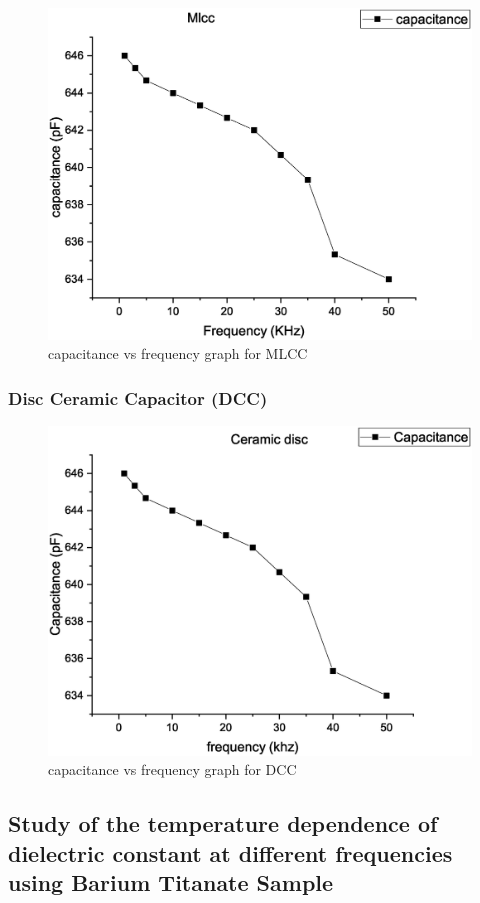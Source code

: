 			
			\begin{figure}[H]
				\centering
				\label{graph:3}
				\includegraphics[width=0.8\columnwidth]{images/g3.eps}
				\caption{capacitance vs frequency graph for MLCC}
			\end{figure}


		\subsubsection{Disc Ceramic Capacitor (DCC)}

			
			\begin{figure}[H]
				\centering
				\label{graph:4}
				\includegraphics[width=0.8\columnwidth]{images/g4.eps}
				\caption{capacitance vs frequency graph for DCC}
			\end{figure}
	\subsection{Study of the temperature dependence of dielectric constant at different frequencies using Barium Titanate Sample}

